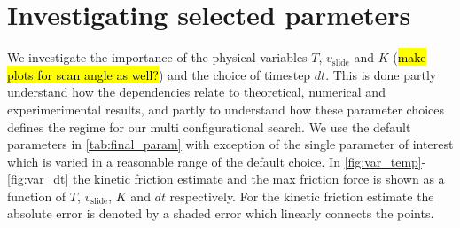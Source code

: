 \section{Investigating selected parmeters}

We investigate the importance of the physical variables $T$, $v_{\text{slide}}$ and $K$ (\hl{make plots for scan angle as well?}) and the choice of timestep $dt$. This is done partly understand how the dependencies relate to theoretical, numerical and experimerimental results, and partly to understand how these parameter choices defines the regime for our multi configurational search. We use the default parameters in \cref{tab:final_param} with exception of the single parameter of interest which is varied in a reasonable range of the default choice. In \cref{fig:var_temp}-\cref{fig:var_dt} the kinetic friction estimate and the max friction force is shown as a function of $T$, $v_{\text{slide}}$, $K$ and $dt$ respectively. For the kinetic friction estimate the absolute error is denoted by a shaded error which linearly connects the points.


